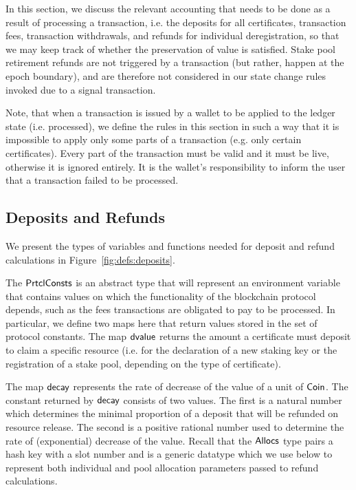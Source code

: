 \documentclass[11pt,a4paper,dvipsnames]{article}
\newcommand{\Coin}{\type{Coin}}
\newcommand{\PrtclConsts}{\type{PrtclConsts}}
\newcommand{\Allocs}{\type{Allocs}}
\theoremstyle{definition}
\theoremstyle{definition}
\begin{document}
In this section, we discuss the relevant accounting that needs to be done
as a result of processing a transaction, i.e. the deposits for all certificates,
transaction fees, transaction withdrawals, and refunds for individual
deregistration, so that we may keep track of whether the preservation of
value is satisfied. Stake pool retirement refunds are not triggered by a
transaction (but rather, happen at the epoch boundary), and are therefore
not considered in our state change rules invoked due to a signal transaction.

Note, that when a transaction is issued by a wallet to be applied to the ledger
state (i.e. processed),
we define the rules in this section in such a way that it is impossible to
apply only some parts of a transaction (e.g. only certain certificates).
Every part of the transaction must be valid and it must be live, otherwise
it is ignored entirely. It is the wallet's responsibility to inform the user
that a transaction failed to be processed.

\subsection{Deposits and Refunds}
\label{sec:deps-refunds}

We present the types of variables and functions needed for deposit and
refund calculations in Figure~\ref{fig:defs:deposits}.

The $\PrtclConsts$ is
an abstract type that will represent an environment variable that contains
values on which the functionality of the blockchain protocol depends, such
as the fees transactions are obligated to pay to be processed. In particular,
we define two maps here that return values stored in the set of protocol
constants. The map $\mathsf{dvalue}$ returns the amount a certificate must
deposit to claim a specific resource (i.e. for the declaration of a new staking
key or the registration of a stake pool, depending on the type of certificate).

The map $\mathsf{decay}$
represents the rate of decrease of the value of a unit of $\Coin$.
The constant returned by $\mathsf{decay}$ consists of two values. The first is
a natural number which determines the minimal proportion of a deposit that will
be refunded on resource release. The second is a positive rational number
used to determine the rate of (exponential) decrease of the value.
Recall that the $\Allocs$ type pairs a hash key with a slot number and is a generic datatype
which we use below to represent both individual and pool allocation
parameters passed to refund calculations.
\end{document}
